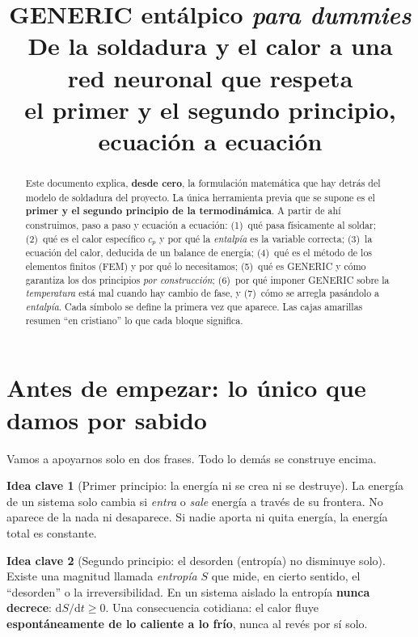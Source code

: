 \documentclass[11pt]{article}
\title{\bfseries GENERIC entálpico \emph{para dummies}\\[4pt]
  \large De la soldadura y el calor a una red neuronal que respeta\\
  el primer y el segundo principio, ecuación a ecuación}
\author{}
\date{}
\newcommand{\dd}{\mathrm{d}}
\theoremstyle{definition}
\newtheorem{idea}{Idea clave}[section]
\theoremstyle{plain}
\begin{document}
\maketitle

\begin{abstract}
\noindent
Este documento explica, \textbf{desde cero}, la formulación matemática que hay
detrás del modelo de soldadura del proyecto. La única herramienta previa que se
supone es el \textbf{primer y el segundo principio de la termodinámica}. A partir
de ahí construimos, paso a paso y ecuación a ecuación: (1)~qué pasa físicamente al
soldar; (2)~qué es el calor específico $c_p$ y por qué la \emph{entalpía} es la
variable correcta; (3)~la ecuación del calor, deducida de un balance de energía;
(4)~qué es el método de los elementos finitos (FEM) y por qué lo necesitamos;
(5)~qué es GENERIC y cómo garantiza los dos principios \emph{por construcción};
(6)~por qué imponer GENERIC sobre la \emph{temperatura} está mal cuando hay cambio
de fase, y (7)~cómo se arregla pasándolo a \emph{entalpía}. Cada símbolo se define
la primera vez que aparece. Las cajas amarillas resumen ``en cristiano'' lo que
cada bloque significa.
\end{abstract}

\tableofcontents
\bigskip

\section{Antes de empezar: lo único que damos por sabido}

Vamos a apoyarnos solo en dos frases. Todo lo demás se construye encima.

\begin{idea}[Primer principio: la energía ni se crea ni se destruye]
La energía de un sistema solo cambia si \emph{entra} o \emph{sale} energía a través
de su frontera. No aparece de la nada ni desaparece. Si nadie aporta ni quita
energía, la energía total es constante.
\end{idea}

\begin{idea}[Segundo principio: el desorden (entropía) no disminuye solo]
Existe una magnitud llamada \emph{entropía} $S$ que mide, en cierto sentido, el
``desorden'' o la irreversibilidad. En un sistema aislado la entropía
\textbf{nunca decrece}: $\dd S/\dd t \ge 0$. Una consecuencia cotidiana: el calor
fluye \textbf{espontáneamente de lo caliente a lo frío}, nunca al revés por sí
solo.
\end{idea}
\end{document}
